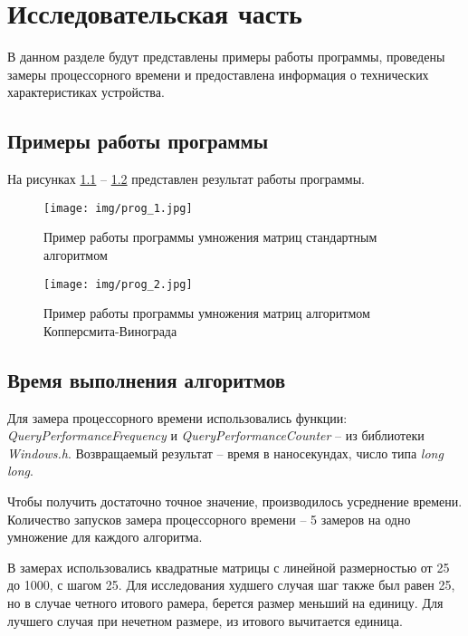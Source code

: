 \chapter{Исследовательская часть}

В данном разделе будут представлены примеры работы программы,
проведены замеры процессорного времени и предоставлена информация
о технических характеристиках устройства.

\section{Примеры работы программы}

На рисунках \ref{img:example1} -- \ref{img:example2} представлен результат работы программы.

\begin{figure}[H]
	\centering
	\texttt{[image: img/prog\_1.jpg]}
	\caption{Пример работы программы умножения матриц стандартным алгоритмом}
	\label{img:example1}
\end{figure}

\FloatBarrier

\begin{figure}[H]
	\centering
	\texttt{[image: img/prog\_2.jpg]}
	\caption{Пример работы программы умножения матриц алгоритмом Копперсмита-Винограда}
	\label{img:example2}
\end{figure}

\FloatBarrier

\section{Время выполнения алгоритмов}

Для замера процессорного времени использовались функции:
\textit{QueryPerformanceFrequency} и \textit{QueryPerformanceCounter}
-- из библиотеки \textit{Windows.h}.
Возвращаемый результат -- время в наносекундах, число типа \textit{long long}.

Чтобы получить достаточно точное значение, производилось усреднение времени.
Количество запусков замера процессорного времени -- 5 замеров на одно умножение
для каждого алгоритма.

В замерах использовались квадратные матрицы с линейной размерностью от 25 до 1000,
с шагом 25. Для исследования худшего случая шаг также был равен 25, но в случае
четного итового рамера, берется размер меньший на единицу. Для лучшего случая
при нечетном размере, из итового вычитается единица.

